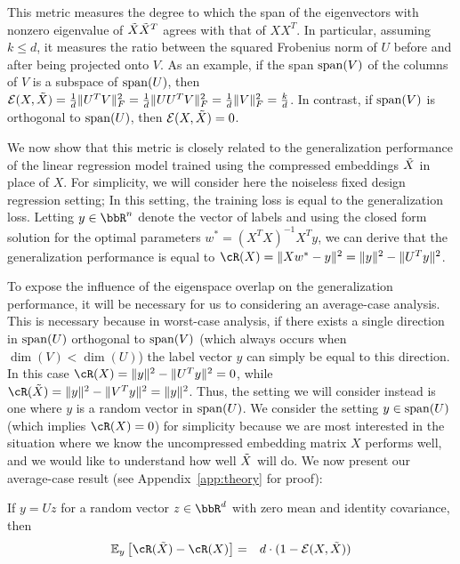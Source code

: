 This metric measures the degree to which the span of the eigenvectors with nonzero eigenvalue of $\tX\tX^T$ agrees with that of $XX^T$.
In particular, assuming $k\leq d$, it measures the ratio between the squared Frobenius norm of $U$ before and after being projected onto $V$.
As an example, if the span $\Span(V)$ of the columns of $V$ is a subspace of $\Span(U)$, then $\eigover(X,\tX) = \frac{1}{d}\|U^T V\|_F^2 = \frac{1}{d}\|UU^T V\|_F^2 = \frac{1}{d}\|V\|_F^2 = \frac{k}{d}$.
In contrast, if $\Span(V)$ is orthogonal to $\Span(U)$, then $\eigover(X,\tX) = 0$.

We now show that this metric is closely related to the generalization performance of the linear regression model trained using the compressed embeddings $\tX$ in place of $X$.
For simplicity, we will consider here the noiseless fixed design regression setting;
In this setting, the training loss is equal to the generalization loss.
Letting $y\in\RR^n$ denote the vector of labels and using the closed form solution for the optimal parameters $w^* = (X^T X)^{-1}X^Ty$, we can derive that the generalization performance is equal to $\cR(X) = \|Xw^* - y\|^2 = \|y\|^2 - \|U^T y\|^2$.

To expose the influence of the eigenspace overlap on the generalization performance, it will be necessary for us to considering an average-case analysis.
This is necessary because in worst-case analysis, if there exists a single direction in $\Span(U)$ orthogonal to $\Span(V)$ (which always occurs when $\dim(V) < \dim(U)$) the label vector $y$ can simply be equal to this direction.
In this case $\cR(X) = \|y\|^2 - \|U^T y\|^2 = 0$, while $\cR(\tX) = \|y\|^2 - \|V^T y\|^2 = \|y\|^2$.
Thus, the setting we will consider instead is one where $y$ is a random vector in $\Span(U)$.
We consider the setting $y \in \Span(U)$ (which implies $\cR(X) = 0$) for simplicity because we are most interested in the situation where we know the uncompressed embedding matrix $X$ performs well, and we would like to understand how well $\tX$ will do.
We now present our average-case result (see Appendix~\ref{app:theory} for proof):

\begin{proposition}
If $y = Uz$ for a random vector $z \in \RR^d$ with zero mean and identity covariance, then
\begin{eqnarray}
\expect{y}{\cR(\tX) - \cR(X)} &=& d\cdot(1 - \eigover(X,\tX))
\end{eqnarray}
\end{proposition}

